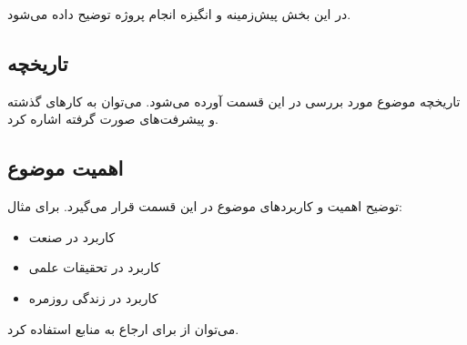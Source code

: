 در این بخش پیش‌زمینه و انگیزه انجام پروژه توضیح داده می‌شود.

\subsection{تاریخچه}
تاریخچه موضوع مورد بررسی در این قسمت آورده می‌شود. می‌توان به کارهای گذشته و پیشرفت‌های صورت گرفته اشاره کرد.

\subsection{اهمیت موضوع}
توضیح اهمیت و کاربردهای موضوع در این قسمت قرار می‌گیرد. برای مثال:

\begin{itemize}
    \item کاربرد در صنعت
    \item کاربرد در تحقیقات علمی
    \item کاربرد در زندگی روزمره
\end{itemize}

می‌توان از \cite{sample-reference} برای ارجاع به منابع استفاده کرد.

